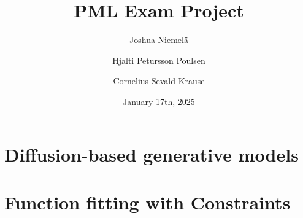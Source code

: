\documentclass{article}
\begin{document}
\title{PML Exam Project}
\author{
  Joshua Niemelä
  \and
  Hjalti Petursson Poulsen
  \and
  Cornelius Sevald-Krause
}
\date{January 17th, 2025}
\maketitle

\section{Diffusion-based generative models}


\section{Function fitting with Constraints}


\appendix

\end{document}
